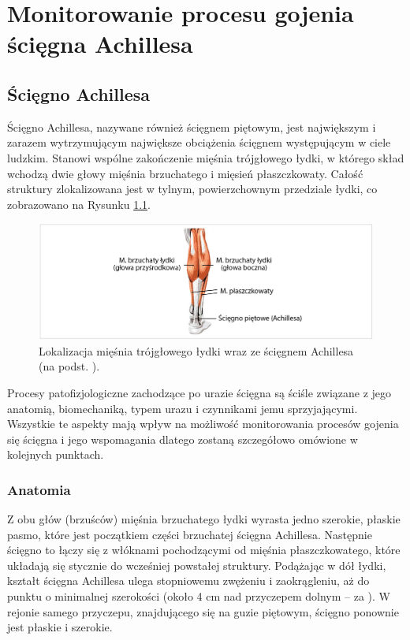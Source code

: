 \chapter{Monitorowanie procesu gojenia ścięgna Achillesa}
\section{Ścięgno Achillesa}
Ścięgno Achillesa, nazywane również ścięgnem piętowym, jest największym i zarazem wytrzymującym największe obciążenia ścięgnem występującym w ciele ludzkim. Stanowi wspólne zakończenie mięśnia trójgłowego łydki, w którego skład wchodzą dwie głowy mięśnia brzuchatego i mięsień płaszczkowaty. Całość struktury zlokalizowana jest w tylnym, powierzchownym przedziale łydki, co zobrazowano \linebreak na Rysunku \ref{muscle_structure}.  
\begin{figure}[h!]
\includegraphics[width=1\textwidth]{figures/muscleStructure.png}
\caption{Lokalizacja mięśnia trójgłowego łydki wraz ze ścięgnem Achillesa (na podst. \cite{Doral2010}).}
\label{muscle_structure}
\end{figure}
\newpage
Procesy patofizjologiczne zachodzące po urazie ścięgna są ściśle związane z jego anatomią, biomechaniką, typem urazu i czynnikami jemu sprzyjającymi. Wszystkie te aspekty mają wpływ na możliwość monitorowania procesów gojenia się ścięgna \linebreak i jego wspomagania  dlatego zostaną szczegółowo omówione w kolejnych punktach. 

\subsection{Anatomia}
\label{anatomia}

Z obu głów (brzuśców) mięśnia brzuchatego łydki wyrasta jedno szerokie, płaskie pasmo, które jest początkiem części brzuchatej ścięgna Achillesa. Następnie ścięgno to łączy się z włóknami pochodzącymi od mięśnia płaszczkowatego, które układają się stycznie do wcześniej powstałej struktury. Podążając w dół łydki, kształt ścięgna Achillesa ulega stopniowemu zwężeniu i zaokrągleniu, aż do punktu o minimalnej szerokości (około 4 cm nad przyczepem dolnym -- za \cite{Doral2010}). W rejonie samego przyczepu, znajdującego się na guzie piętowym, ścięgno ponownie jest płaskie i szerokie.

